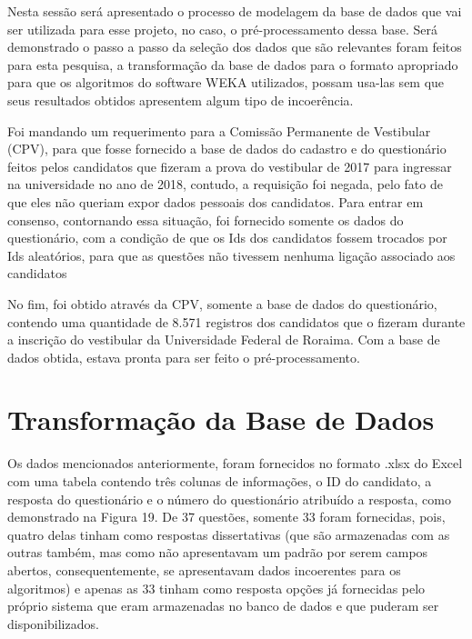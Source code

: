 \label{chapter:projeto}

\par
Nesta sessão será apresentado o processo de modelagem da base de dados que vai ser utilizada para esse projeto, no caso, o pré-processamento dessa base. Será demonstrado o passo a passo da seleção dos dados que são relevantes foram feitos para esta pesquisa, a transformação da base de dados para o formato apropriado para que os algoritmos do software WEKA utilizados, possam usa-las sem que seus resultados obtidos apresentem algum tipo de incoerência.

\par
Foi mandando um requerimento para a Comissão Permanente de Vestibular (CPV), para que fosse fornecido a base de dados do cadastro e do questionário feitos pelos candidatos que fizeram a prova do vestibular de 2017 para ingressar na universidade no ano de 2018, contudo, a requisição foi negada, pelo fato de que eles não queriam expor dados pessoais dos candidatos. Para entrar em consenso, contornando essa situação, foi fornecido somente os dados do questionário, com a condição de que os Ids dos candidatos fossem trocados por Ids aleatórios, para que as questões não tivessem nenhuma ligação associado aos candidatos

\par
No fim, foi obtido através da CPV, somente a base de dados do questionário, contendo uma quantidade de 8.571 registros dos candidatos que o fizeram durante a inscrição do vestibular da Universidade Federal de Roraima. Com a base de dados obtida, estava pronta para ser feito o pré-processamento.

\section{Transformação da Base de Dados}

\par
Os dados mencionados anteriormente, foram fornecidos no formato .xlsx do Excel com uma tabela contendo três colunas de informações, o ID do candidato, a resposta do questionário e o número do questionário atribuído a resposta, como demonstrado na Figura 19. De 37 questões, somente 33 foram fornecidas, pois, quatro delas tinham como respostas dissertativas (que são armazenadas com as outras também, mas como não apresentavam um padrão por serem campos abertos, consequentemente, se apresentavam dados incoerentes para os algoritmos) e apenas as 33 tinham como resposta opções já fornecidas pelo próprio sistema que eram armazenadas no banco de dados e que puderam ser disponibilizados.

